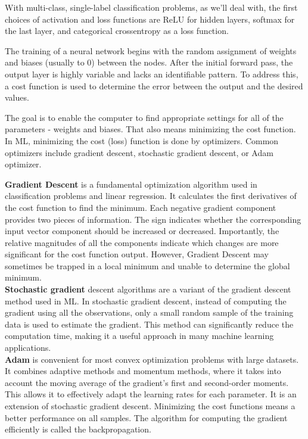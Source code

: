 With multi-class, single-label classification problems, as we'll deal with, the first choices of activation and loss functions are ReLU for hidden layers, softmax for the last layer, and categorical crossentropy as a loss function.



The training of a neural network begins with the random assignment of weights and biases (usually to 0) between the nodes. After the initial forward pass, the output layer is highly variable and lacks an identifiable pattern. To address this, a cost function is used to determine the error between the output and the desired values. 

The goal is to enable the computer to find appropriate settings for all of the parameters - weights and biases. That also means minimizing the cost function. \newline
In ML, minimizing the cost (loss) function is done by optimizers. Common optimizers include gradient descent, stochastic gradient descent, or Adam optimizer.


\textbf{Gradient Descent} is a fundamental optimization algorithm used in classification problems and linear regression. It calculates the first derivatives of the cost function to find the minimum. 
Each negative gradient component provides two pieces of information. The sign indicates whether the corresponding input vector component should be increased or decreased. Importantly, the relative magnitudes of all the components indicate which changes are more significant for the cost function output.
However, Gradient Descent may sometimes be trapped in a local minimum and unable to determine the global minimum.\\

\textbf{Stochastic gradient} descent algorithms are a variant of the gradient descent method used in ML. In stochastic gradient descent, instead of computing the gradient using all the observations, only a small random sample of the training data is used to estimate the gradient. This method can significantly reduce the computation time, making it a useful approach in many machine learning applications.\\

\textbf{Adam} is convenient for most convex optimization problems with large datasets. It combines adaptive methods and momentum methods, where it takes into account the moving average of the gradient's first and second-order moments. This allows it to effectively adapt the learning rates for each parameter.
It is an extension of stochastic gradient descent.\newline
Minimizing the cost functions means a better performance on all samples. The algorithm for computing the gradient efficiently is called the backpropagation.
